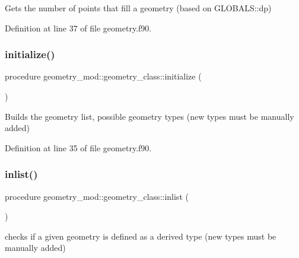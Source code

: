 Gets the number of points that fill a geometry (based on G\+L\+O\+B\+A\+L\+S\+::dp) 



Definition at line 37 of file geometry.\+f90.

\mbox{\label{structgeometry__mod_1_1geometry__class_a97a9a90ff4143d41fe57eb0e6d1c76a1}} 
\subsubsection{\texorpdfstring{initialize()}{initialize()}}
{\footnotesize\ttfamily procedure geometry\+\_\+mod\+::geometry\+\_\+class\+::initialize (\begin{DoxyParamCaption}{ }\end{DoxyParamCaption})\hspace{0.3cm}{\ttfamily [private]}}



Builds the geometry list, possible geometry types (new types must be manually added) 



Definition at line 35 of file geometry.\+f90.

\mbox{\label{structgeometry__mod_1_1geometry__class_a6dfcc19f822da875bebc58c3bf26e999}} 
\subsubsection{\texorpdfstring{inlist()}{inlist()}}
{\footnotesize\ttfamily procedure geometry\+\_\+mod\+::geometry\+\_\+class\+::inlist (\begin{DoxyParamCaption}{ }\end{DoxyParamCaption})\hspace{0.3cm}{\ttfamily [private]}}



checks if a given geometry is defined as a derived type (new types must be manually added) 



